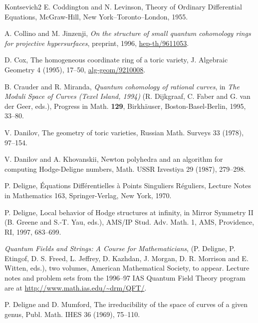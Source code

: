 \begin{thebibliography}{Kontsevich2}
\hypertarget{bib:CL}{}
E. Coddington and N. Levinson, Theory of Ordinary Differential Equations,
McGraw-Hill, New York--Toronto--London, 1955.

\hypertarget{bib:CJ}{} A. Collino and M. Jinzenji, \emph{On the structure of small quantum cohomology rings for projective hypersurfaces}, preprint, 1996, \href{https://arxiv.org/abs/hep-th/9611053}{hep-th/9611053}.

\hypertarget{bib:Cox}{}
D. Cox, The homogeneous coordinate ring of a toric variety,
J. Algebraic Geometry 4 (1995), 17--50, \href{https://arxiv.org/abs/alg-geom/9210008}{alg-geom/9210008}.

\hypertarget{bib:CM}{} B. Crauder and R. Miranda, \emph{Quantum cohomology of rational curves}, in \emph{The Moduli Space of Curves (Texel Island, 1994)} (R. Dijkgraaf, C. Faber and G. van der Geer, eds.), Progress in Math. \textbf{129}, Birkhäuser, Boston-Basel-Berlin, 1995, 33--80.

\hypertarget{bib:Danilov}{}
V. Danilov, The geometry of toric varieties,
Russian Math. Surveys 33 (1978), 97--154.

\hypertarget{bib:DK}{}
V. Danilov and A. Khovanskii, Newton polyhedra and an algorithm for computing
Hodge-Deligne numbers, Math. USSR Izvestiya 29 (1987), 279--298.

\hypertarget{bib:Deligne1}{}
P. Deligne, Équations Différentielles à Points Singuliers Réguliers,
Lecture Notes in Mathematics 163, Springer-Verlag, New York, 1970.

\hypertarget{bib:Deligne2}{}
P. Deligne, Local behavior of Hodge structures at infinity, in Mirror Symmetry II
(B. Greene and S.-T. Yau, eds.), AMS/IP Stud. Adv. Math. 1, AMS,
Providence, RI, 1997, 683--699.

\hypertarget{bib:DEFJKMMW}{} \emph{Quantum Fields and Strings: A Course for Mathematicians}, (P. Deligne, P. Etingof, D. S. Freed, L. Jeffrey, D. Kazhdan, J. Morgan, D. R. Morrison and E. Witten, eds.), two volumes, American Mathematical Society, to appear. Lecture notes and problem sets from the 1996--97 IAS Quantum Field Theory program are at \url{http://www.math.ias.edu/~drm/QFT/}.

\hypertarget{bib:DM}{}
P. Deligne and D. Mumford, The irreducibility of the space of curves of a given genus, Publ. Math. IHES 36 (1969), 75--110.


\end{thebibliography}
